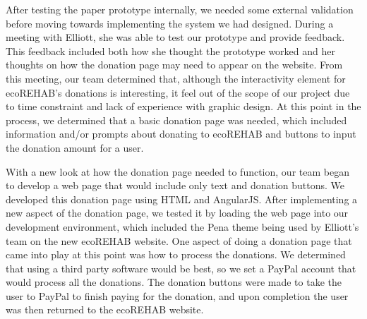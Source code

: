 \documentclass[letter]{article}
\begin{document}

After testing the paper prototype internally, we needed some external
validation before moving towards implementing the system we had
designed. During a meeting with Elliott, she was able to test our
prototype and provide feedback. This feedback included both how she
thought the prototype worked and her thoughts on how the donation page
may need to appear on the website. From this meeting, our team
determined that, although the interactivity element for ecoREHAB's
donations is interesting, it feel out of the scope of our project due
to time constraint and lack of experience with graphic design. At this
point in the process, we determined that a basic donation page was
needed, which included information and/or prompts about donating to
ecoREHAB and buttons to input the donation amount for a user.

With a new look at how the donation page needed to function, our team
began to develop a web page that would include only text and donation
buttons. We developed this donation page using HTML and
AngularJS. After implementing a new aspect of the donation page, we
tested it by loading the web page into our development environment,
which included the Pena theme being used by Elliott's team on the new
ecoREHAB website. One aspect of doing a donation page that came into
play at this point was how to process the donations. We determined
that using a third party software would be best, so we set a PayPal
account that would process all the donations. The donation buttons
were made to take the user to PayPal to finish paying for the
donation, and upon completion the user was then returned to the
ecoREHAB website.
\end{document}
